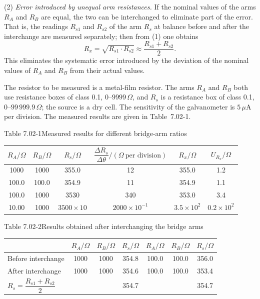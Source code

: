 (2) \emph{Error introduced by unequal arm resistances.} If the nominal values of the arms $R_A$ and $R_B$ are equal, the two can be interchanged to eliminate part of the error. That is, the readings $R_{s1}$ and $R_{s2}$ of the arm $R_s$ at balance before and after the interchange are measured separately; then from (1) one obtains
\[
R_x=\sqrt{R_{s1}\cdot R_{s2}}\approx\frac{R_{s1}+R_{s2}}{2}.
\]
This eliminates the systematic error introduced by the deviation of the nominal values of $R_A$ and $R_B$ from their actual values.

The resistor to be measured is a metal-film resistor. The arms $R_A$ and $R_B$ both use resistance boxes of class 0.1, $0$--$9999\,\Omega$, and $R_s$ is a resistance box of class 0.1, $0$--$99\,999.9\,\Omega$; the source is a dry cell. The sensitivity of the galvanometer is $5\,\mu$A per division. The measured results are given in Table~7.02-1.

\begin{center}
{\small Table 7.02-1\quad Measured results for different bridge-arm ratios}\\[2pt]
\begin{tabular}{cccccc}
\toprule
$R_A/\Omega$ & $R_B/\Omega$ & $R_s/\Omega$ & $\dfrac{\Delta R_s}{\Delta\theta}/(\Omega\ \text{per division})$ & $R_x/\Omega$ & $U_{R_x}/\Omega$\\
\midrule
1000  & 1000  & 355.0 & 12 & 355.0 & 1.2\\
100.0 & 100.0 & 354.9 & 11 & 354.9 & 1.1\\
100.0 & 1000  & 3530  & 340 & 353.0 & 3.4\\
10.00 & 1000  & $3500\times10$ & $2000\times10^{-1}$ & $3.5\times10^{2}$ & $0.2\times10^{2}$\\
\bottomrule
\end{tabular}
\end{center}

\begin{center}
{\small Table 7.02-2\quad Results obtained after interchanging the bridge arms}\\[2pt]
\begin{tabular}{lcccccc}
\toprule
& $R_A/\Omega$ & $R_B/\Omega$ & $R_s/\Omega$ & $R_A/\Omega$ & $R_B/\Omega$ & $R_s/\Omega$\\
\midrule
Before interchange & 1000 & 1000 & 354.8 & 100.0 & 100.0 & 356.0\\
After interchange  & 1000 & 1000 & 354.6 & 100.0 & 100.0 & 353.4\\
\midrule
$R_s=\dfrac{R_{s1}+R_{s2}}{2}$ & & & 354.7 & & & 354.7\\
\bottomrule
\end{tabular}
\end{center}

